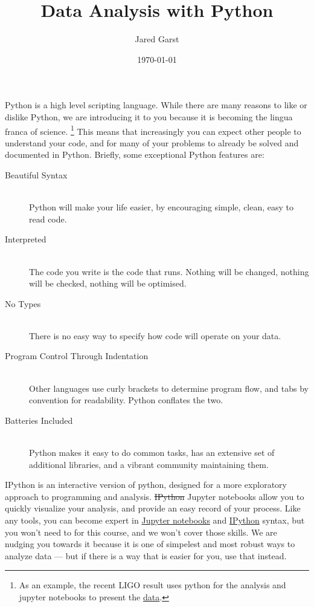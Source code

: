 \documentclass[justified, nobib]{tufte-handout}
\title{Data Analysis with Python}
\author{Jared Garst}
\date{\today} %
\newcommand{\ipythonTutorialLink}
  {http://ipython.readthedocs.org/en/stable/interactive/index.html}
\newcommand{\jupyterInfoLink}
  {http://jupyter-notebook.readthedocs.org/en/latest/notebook.html\#basic-workflow}
\begin{document}
\maketitle
\bigskip

\noindent
Python is a high level scripting language.
While there are many reasons to like or dislike Python, we are introducing it to you because it is becoming the lingua franca of science.
\footnote{As an example, the recent LIGO result uses python for the analysis and jupyter notebooks to present the \href{https://losc.ligo.org/s/events/GW150914/GW150914_tutorial.html}{data}.}
This means that increasingly you can expect other people to understand
your code, and for many of your problems to already be solved and documented in
Python.
Briefly, some exceptional Python features are:

\begin{description}
\item[Beautiful Syntax] \hfill \\
  Python will make your life easier, by encouraging simple, clean, easy to read
  code.
\item[Interpreted] \hfill \\
  The code you write is the code that runs. Nothing will be changed, nothing
  will be checked, nothing will be optimised.
\item[No Types] \hfill \\
  There is no easy way to specify how code will operate on your data.
\item[Program Control Through Indentation] \hfill \\
  Other languages use curly brackets \ipythoninline{{}} to determine program
  flow, and tabs by convention for readability.
  Python conflates the two.
\item[Batteries Included] \hfill \\
  Python makes it easy to do common tasks, has an extensive set of additional
  libraries, and a vibrant community maintaining them.
\end{description}

\noindent
IPython is an interactive version of python, designed for a more exploratory
approach to programming and analysis.
\sout{IPython} Jupyter notebooks allow you to quickly visualize your analysis,
and provide an easy record of your process.
Like any tools, you can become expert in \href{\jupyterInfoLink}{Jupyter notebooks} and \href{\ipythonTutorialLink}{IPython} syntax, but you won't need to for this course, and we won't cover those skills.
We are nudging you towards it because it is one of simpelest and most robust ways to analyze data --- but if there is a way that is easier for you, use that instead.
\end{document}
